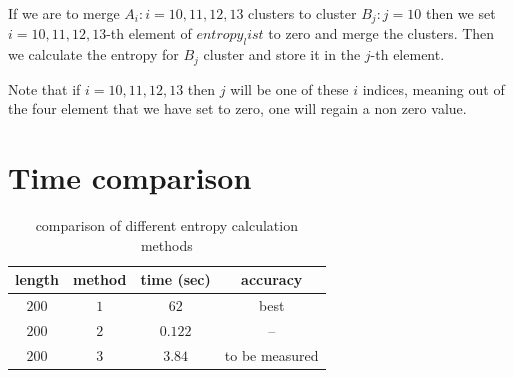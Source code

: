 \documentclass[10pt,a4paper]{report}
\begin{document}
	If we are to merge $A_i : i={10,11,12,13}$ clusters to cluster $B_j : j = {10}$ then we set $i={10,11,12,13}$-th element of $entropy_list$ to zero and merge the clusters. Then we calculate the entropy for $B_j$ cluster and store it in the $j$-th element.
	
	Note that if $i={10,11,12,13}$ then $j$ will be one of these $i$ indices, meaning out of the four element that we have set to zero, one will regain a non zero value.
	
	\section{Time comparison}
	\begin{table}
		\centering
		\begin{tabular}{c|c|c|c}
			length & method &  time (sec) & accuracy \\
			\hline
			$200$ & $1$ & $62$ & best\\
			$200$ & $2$ & $0.122$ &	--\\
			$200$ & $3$ & $3.84$ & to be measured
		\end{tabular}
	\caption{comparison of different entropy calculation methods}
	\end{table}
\end{document}
